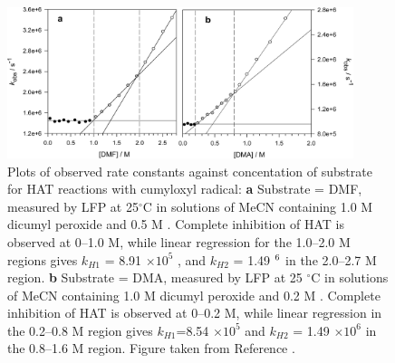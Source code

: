 \begin{figure}[htb]
  \centering
  \includegraphics[width=0.9\textwidth]{figures/exptdmadmf}
  \caption[Plots of observed rate constants against concentration of substrate for HAT
  reactions with cumyloxyl radical.]{Plots of observed rate constants against
    concentation of substrate for HAT reactions with cumyloxyl radical: \textbf{a}
    Substrate = DMF, measured by LFP at 25$^{\circ}$C in solutions of MeCN
    containing 1.0 M dicumyl peroxide and 0.5 M . Complete inhibition
    of HAT is observed at 0--1.0 M, while linear regression for the 1.0--2.0
    M regions gives $k_{H1}$ = 8.91 $\times 10^5$ \Ms, and $k_{H2}$ = 1.49
    $\time 10^6$ \Ms in the 2.0--2.7 M region. \textbf{b} Substrate = DMA,
    measured by LFP at 25 $^{\circ}$C in solutions of MeCN containing 1.0 M
    dicumyl peroxide and 0.2 M . Complete inhibition of HAT is
    observed at 0--0.2 M, while linear regression in the 0.2--0.8 M
    region gives $k_{H1}$=8.54 $\times 10^5$ \Ms and $k_{H2}$ = 1.49
    $\times 10^6$ \Ms in the 0.8--1.6 M region. Figure taken from Reference
    .}
\label{fig:expdmadmf}
\end{figure}


\newpage


